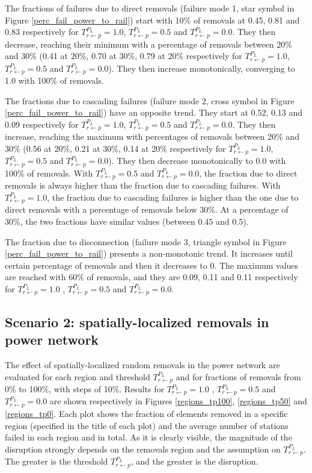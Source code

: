 \documentclass[review]{elsarticle}
\begin{document}
The fractions of failures due to direct removals (failure mode 1, star symbol in Figure \ref{perc_fail_power_to_rail}) start with 10\% of removals at 0.45, 0.81 and 0.83 respectively for $T_{r \leftarrow p}^{P_L}=1.0$, $T_{r \leftarrow p}^{P_L}=0.5$ and $T_{r \leftarrow p}^{P_L}=0.0$. They then decrease, reaching their minimum with a percentage of removals between 20\% and 30\% (0.41 at 20\%, 0.70 at 30\%, 0.79 at 20\% respectively for $T_{r \leftarrow p}^{P_L}=1.0$, $T_{r \leftarrow p}^{P_L}=0.5$ and $T_{r \leftarrow p}^{P_L}=0.0$). They then increase monotonically, converging to 1.0 with 100\% of removals.

The fractions due to cascading failures (failure mode 2, cross symbol in Figure \ref{perc_fail_power_to_rail}) have an opposite trend. They start at 0.52, 0.13 and 0.09 respectively for $T_{r \leftarrow p}^{P_L}=1.0$, $T_{r \leftarrow p}^{P_L}=0.5$ and $T_{r \leftarrow p}^{P_L}=0.0$. They then increase, reaching the maximum with percentages of removals between 20\% and 30\% (0.56 at 20\%, 0.21 at 30\%, 0.14 at 20\% respectively for $T_{r \leftarrow p}^{P_L}=1.0$, $T_{r \leftarrow p}^{P_L}=0.5$ and $T_{r \leftarrow p}^{P_L}=0.0$). They then decrease monotonically to 0.0 with 100\% of removals. With $T_{r \leftarrow p}^{P_L}=0.5$ and $T_{r \leftarrow p}^{P_L}=0.0$, the fraction due to direct removals is always higher than the fraction due to cascading failures. With $T_{r \leftarrow p}^{P_L}=1.0$, the fraction due to cascading failures is higher than the one due to direct removals with a percentage of removals below 30\%. At a percentage of 30\%, the two fractions have similar values (between 0.45 and 0.5).

The fraction due to disconnection (failure mode 3, triangle symbol in Figure \ref{perc_fail_power_to_rail}) presents a non-monotonic trend. It increases until certain percentage of removals and then it decreases to 0. The maximum values are reached with 60\% of removals, and they are 0.09, 0.11 and 0.11 respectively for $T_{r \leftarrow p}^{P_L}=1.0$ , $T_{r \leftarrow p}^{P_L}=0.5$ and $T_{r \leftarrow p}^{P_L}=0.0$.

	
\subsection{Scenario 2: spatially-localized removals in power network}
The effect of spatially-localized random removals in the power network are evaluated for each region and threshold $T_{r \leftarrow p}^{P_L}$ and for fractions of removals from 0\% to 100\%, with steps of 10\%. Results for $T_{r \leftarrow p}^{P_L}=1.0$ , $T_{r \leftarrow p}^{P_L}=0.5$ and $T_{r \leftarrow p}^{P_L}=0.0$ are shown respectively in Figures \ref{regions_tp100}, \ref{regions_tp50} and \ref{regions_tp0}. Each plot shows the fraction of elements removed in a specific region (specified in the title of each plot) and the average number of stations failed in each region and in total. As it is clearly visible, the magnitude of the disruption strongly depends on the removals region and the assumption on $T_{r \leftarrow p}^{P_L}$. The greater is the threshold $T_{r \leftarrow p}^{P_L}$, and the greater is the disruption.
\end{document}
